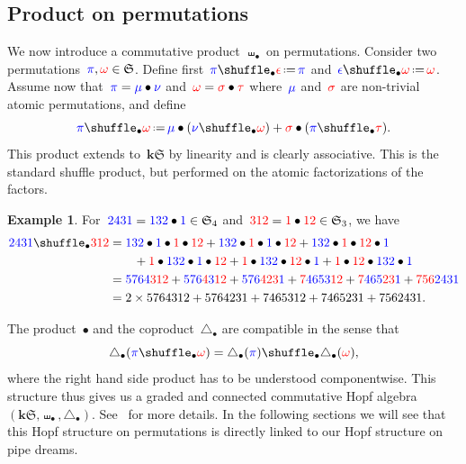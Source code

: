 \documentclass{amsart}
\theoremstyle{definition}
\newtheorem{example}[theorem]{Example}
\newcommand{\bk}{\mathbf{k}} %
\newcommand{\eqdef}{\mbox{\,\raisebox{0.2ex}{\scriptsize\ensuremath{\mathrm:}}\ensuremath{=}\,}} %
\renewcommand{\b}[1]{{\color{blue} #1}} %
\renewcommand{\r}[1]{{\color{red} #1}} %
\newcommand{\fS}{\mathfrak{S}} %
\newcommand{\gdproduct}{\bullet} %
\newcommand{\gdshuffle}{\shuffle_\gdproduct} %
\newcommand{\gddeconcat}{\coproduct_\gdproduct} %
\newcommand{\HS}{{\bk\fS}} %
\newcommand{\coproduct}{\triangle} %
\begin{document}

\subsection{Product on permutations}
\label{subsec:productPermutations}

We now introduce a commutative product~$\gdshuffle$ on permutations. Consider two permutations~$\b{\pi}, \r{\omega} \in \fS$. Define first~$\b{\pi} \gdshuffle \r{\epsilon} \eqdef \b{\pi}$ and~$\b{\epsilon} \gdshuffle \r{\omega} \eqdef \r{\omega}$. Assume now that~$\b{\pi} = \b{\mu} \gdproduct \b{\nu}$ and~$\r{\omega} = \r{\sigma} \gdproduct \r{\tau}$ where~$\b{\mu}$ and~$\r{\sigma}$ are non-trivial atomic permutations, and define
\[
\b{\pi} \gdshuffle \r{\omega} \eqdef \b{\mu} \gdproduct (\b{\nu} \gdshuffle \r{\omega}) + \r{\sigma} \gdproduct (\b{\pi} \gdshuffle \r{\tau}).
\]
This product extends to~$\HS$ by linearity and is clearly associative.
This is the standard shuffle product, but performed on the atomic factorizations of the factors.

\begin{example} 
 For~$\b{2431} = \b{132} \gdproduct \b{1} \in \fS_4$ and~$\r{312} = \r{1} \gdproduct \r{12} \in \fS_3$, we have 
\begin{align*}
\b{2431} \gdshuffle \r{312} & = \b{132} \gdproduct \b{1} \gdproduct \r{1} \gdproduct \r{12} + \b{132} \gdproduct \r{1} \gdproduct \b{1} \gdproduct  \r{12} + \b{132} \gdproduct  \r{1} \gdproduct \r{12} \gdproduct \b{1} \\
& \qquad + \r{1} \gdproduct \b{132} \gdproduct \b{1} \gdproduct \r{12} + \r{1} \gdproduct \b{132} \gdproduct \r{12} \gdproduct \b{1} + \r{1} \gdproduct \r{12} \gdproduct  \b{132} \gdproduct \b{1} \\
& = \b{576}\b{4}\r{3}\r{12} + \b{576}\r{4}\b{3}\r{12} + \b{576}\r{4}\r{23}\b{1} + \r{7}\b{465}\b{3}\r{12} + \r{7}\b{465}\r{23}\b{1} + \r{7}\r{56}\b{243}\b{1} \\
& = 2 \times 5764312 + 5764231 + 7465312 + 7465231 + 7562431.
\end{align*}
\end{example}

The product~$\gdproduct$ and the coproduct~$\gddeconcat$ are compatible in the sense that
\[
\gddeconcat(\b{\pi} \gdshuffle \r{\omega}) = \gddeconcat(\b{\pi}) \gdshuffle \gddeconcat(\r{\omega}),
\]
where the right hand side product has to be understood componentwise. This structure thus gives us a graded and connected commutative Hopf algebra~$(\HS, \gdshuffle, \gddeconcat)$. See~\cite{Vargas} for more details.
In the following sections we will see that this Hopf structure on permutations is directly linked to our Hopf structure on pipe dreams.
\end{document}
